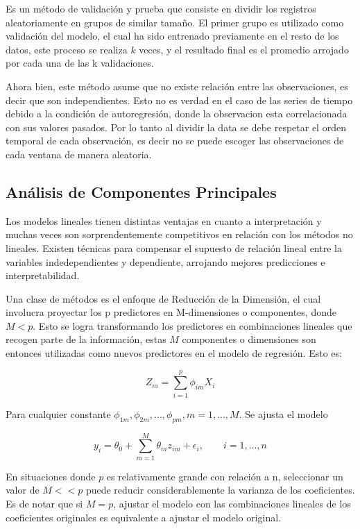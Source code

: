 \documentclass[a4paper,12pt]{Latex/Classes/PhDthesisPSnPDF}
\begin{document}
Es un método de validación y prueba que consiste en dividir los registros aleatoriamente en grupos de similar tamaño. El primer grupo es utilizado como validación del modelo, el cual ha sido entrenado previamente en el resto de los datos, este proceso se realiza $k$ veces, y el resultado final es el promedio arrojado por cada una de las k validaciones.

Ahora bien, este método asume que no existe relación entre las observaciones, es decir que son independientes. Esto no es verdad en el caso de las series de tiempo debido a la condición de autoregresión, donde la observacion esta correlacionada con sus valores pasados. Por lo tanto al dividir la data se debe respetar el orden temporal de cada observación, es decir no se puede escoger las observaciones de cada ventana de manera aleatoria. 

\subsection{Análisis de Componentes Principales}

Los modelos lineales tienen distintas ventajas en cuanto a interpretación y muchas veces son sorprendentemente competitivos en relación con los métodos no lineales. Existen técnicas para compensar el supuesto de relación lineal entre la variables indedependientes y dependiente, arrojando mejores predicciones e interpretabilidad. 

Una clase de métodos es el enfoque de Reducción de la Dimensión, el cual involucra proyectar los p predictores en M-dimensiones o componentes, donde $M < p$. Esto se logra transformando los predictores en combinaciones lineales que recogen parte de la información, estas $M$ componentes o dimensiones son entonces utilizadas como nuevos predictores en el modelo de regresión. Esto es:

$$ Z_{m} = \sum_{i = 1}^{p} \phi_{im}X_{i} $$

Para cualquier constante $ \phi_{1m}, \phi_{2m}, ..., \phi_{pm}, m = 1, ..., M $. Se ajusta el modelo

$$ y_{i} = \theta_{0} + \sum_{m = 1}^{M} \theta_{m}z_{im} + \epsilon_{i},  \qquad i = 1, ..., n $$

En situaciones donde $p$ es relativamente grande con relación a n, seleccionar un valor de $M << p$ puede reducir considerablemente la varianza de los coeficientes. Es de notar que si $M = p$, ajustar el modelo con las combinaciones lineales de los coeficientes originales es equivalente a ajustar el modelo original.
\end{document}
